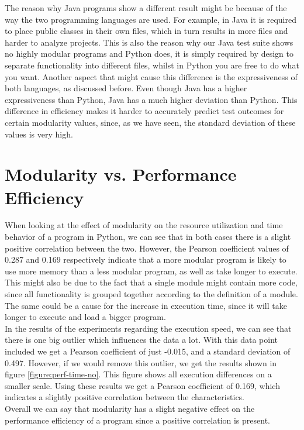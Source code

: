 \documentclass[twoside]{uva-inf-bachelor-thesis}
\begin{document}
The reason why Java programs show a different result might be because of the way the two programming languages are used. For example, in Java it is required to place public classes in their own files, which in turn results in more files and harder to analyze projects. This is also the reason why our Java test suite shows no highly modular programs and Python does, it is simply required by design to separate functionality into different files, whilst in Python you are free to do what you want. Another aspect that might cause this  difference is the expressiveness of both languages, as discussed before. Even though Java has a higher expressiveness than Python\cite{Expressiveness}, Java has a much higher deviation than Python. This difference in efficiency makes it harder to accurately predict test outcomes for certain modularity values, since, as we have seen, the standard deviation of these values is very high.

\section{Modularity vs. Performance Efficiency}
When looking at the effect of modularity on the resource utilization and time behavior of a program in Python, we can see that in both cases there is a slight positive correlation between the two. However, the Pearson coefficient values of 0.287 and 0.169 respectively indicate that a more modular program is likely to use more memory than a less modular program, as well as take longer to execute. This might also be due to the fact that a single module might contain more code, since all functionality is grouped together according to the definition of a module. The same could be a cause for the increase in execution time, since it will take longer to execute and load a bigger program.\\

In the results of the experiments regarding the execution speed, we can see that there is one big outlier which influences the data a lot. With this data point included we get a Pearson coefficient of just -0.015, and a standard deviation of 0.497. However, if we would remove this outlier, we get the results shown in figure \ref{figure:perf-time-no}. This figure shows all execution differences on a smaller scale. Using these results we get a Pearson coefficient of 0.169, which indicates a slightly positive correlation between the characteristics.\\

Overall we can say that modularity has a slight negative effect on the performance efficiency of a program since a positive correlation is present. 
\end{document}
